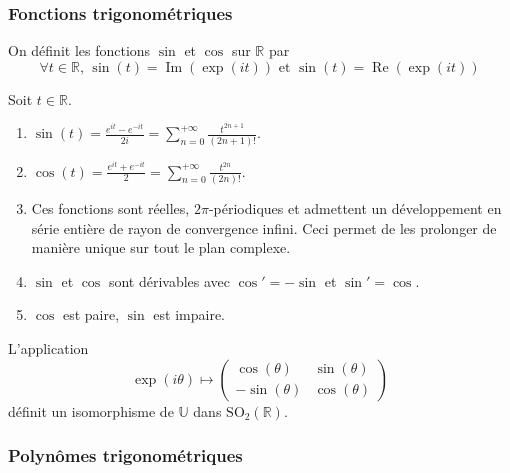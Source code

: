   \subsubsection{Fonctions trigonométriques}

  \begin{definition}
    On définit les fonctions $\sin$ et $\cos$ sur $\mathbb{R}$ par
    \[ \forall t \in \mathbb{R}, \, \sin(t) = \operatorname{Im}(\exp(it)) \text{ et } \sin(t) = \operatorname{Re}(\exp(it)) \]
  \end{definition}


  \begin{proposition}
    Soit $t \in \mathbb{R}$.
    \begin{enumerate}[label=(\roman*)]
      \item $\sin(t) = \frac{e^{it} - e^{-it}}{2i} = \sum_{n=0}^{+\infty} \frac{t^{2n+1}}{(2n+1)!}$.
      \item $\cos(t) = \frac{e^{it} + e^{-it}}{2} = \sum_{n=0}^{+\infty} \frac{t^{2n}}{(2n)!}$.
      \item Ces fonctions sont réelles, $2\pi$-périodiques et admettent un développement en série entière de rayon de convergence infini. Ceci permet de les prolonger de manière unique sur tout le plan complexe.
      \item $\sin$ et $\cos$ sont dérivables avec $\cos' = -\sin$ et $\sin' = \cos$.
      \item $\cos$ est paire, $\sin$ est impaire.
    \end{enumerate}
  \end{proposition}


  \begin{proposition}
    L'application
    \[ \exp(i\theta) \mapsto
    \begin{pmatrix}
      \cos(\theta) & \sin(\theta) \\
      -\sin(\theta) & \cos(\theta)
    \end{pmatrix}
    \]
    définit un isomorphisme de $\mathbb{U}$ dans $\mathrm{SO}_2(\mathbb{R})$.
  \end{proposition}

  \subsubsection{Polynômes trigonométriques}


